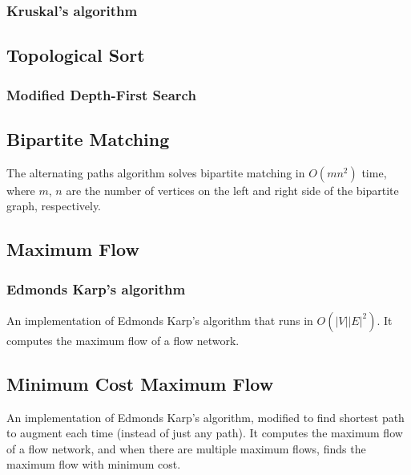 \documentclass[10pt,a4paper,titlepage]{article}
\begin{document}
\subsubsection{Kruskal's algorithm}

\subsection{Topological Sort}
\subsubsection{Modified Depth-First Search}


\subsection{Bipartite Matching}
The alternating paths algorithm solves bipartite matching in $O(mn^2)$ time, where $m$, $n$ are the number of vertices on the left and right side of the bipartite graph, respectively.


\subsection{Maximum Flow}
\subsubsection{Edmonds Karp's algorithm}
An implementation of Edmonds Karp's algorithm that runs in $O(|V||E|^2)$. It computes the maximum flow of a flow network.

\subsection{Minimum Cost Maximum Flow}
An implementation of Edmonds Karp's algorithm, modified to find shortest path to augment each time (instead of just any path). It computes the maximum flow of a flow network, and when there are multiple maximum flows, finds the maximum flow with minimum cost.

\end{document}
